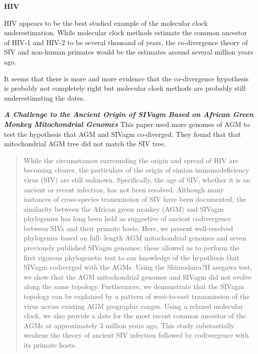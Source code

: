 \textbf{HIV}  

HIV appears to be the best studied example of the molecular clock underestimation. 
While molecular clock methods estimate the common ancestor of HIV-1 and HIV-2 to be several thousand of years, the co-divergence theory of SIV and non-human primates would be the estimates around several million years ago. 

It seems that there is more and more evidence that the co-divergence hypothesis is probably not completely right but molecular clock methods are probably still underestimating the dates. 


\textbf{\textit{A Challenge to the Ancient Origin of SIVagm
Based on African Green Monkey
Mitochondrial Genomes}}\citep{wertheim2007challenge}
This paper used more genomes of AGM to test the hypothesis that AGM and SIVagm co-diverged. They found that that mitochondrial AGM tree did not match the SIV tree. 
\begin{quote}
While the circumstances surrounding the origin and spread of HIV are becoming clearer, the particulars of the origin of simian immunodeficiency virus (SIV) are still unknown. Specifically, the age of SIV, whether it is an ancient or recent infection, has not been resolved. Although many instances of cross-species transmission of SIV have been documented, the similarity between the African green monkey (AGM) and SIVagm phylogenies has long been held as suggestive of ancient codivergence between SIVs and their primate hosts. Here, we present well-resolved phylogenies based on full- length AGM mitochondrial genomes and seven previously published SIVagm genomes; these allowed us to perform the first rigorous phylogenetic test to our knowledge of the hypothesis that SIVagm codiverged with the AGMs. Using the Shimodaira?H	asegawa test, we show that the AGM mitochondrial genomes and SIVagm did not evolve along the same topology. Furthermore, we demonstrate that the SIVagm topology can be explained by a pattern of west-to-east transmission of the virus across existing AGM geographic ranges. Using a relaxed molecular clock, we also provide a date for the most recent common ancestor of the AGMs at approximately 3 million years ago. This study substantially weakens the theory of ancient SIV infection followed by codivergence with its primate hosts.
\end{quote}

